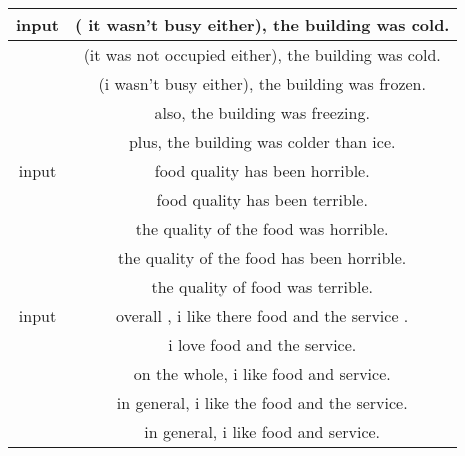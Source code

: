 \iffalse
  \begin{table}[ht]
\centering
\begin{tabular}[t]{c|c}
\hline

\hline
\small input	&\small ( it wasn't busy either), the building was cold.  	\\\hline
\small &	\small (it was not occupied either), the building was cold. 		\\
\small 	&\small (i wasn't busy either), the building was frozen. 	\\
\small 	&\small also, the building was freezing.  	\\
\small 	&\small plus, the building was colder than ice. \\\hline
\small input &\small food quality has been horrible.
\\\hline
\small &\small 		food quality has been terrible.  	\\
\small 	&\small the quality of the food was horrible.  	\\
\small & \small 	the quality of the food has been horrible. 	\\
\small 	& \small the quality of food was terrible.  \\
\hline
\small input	&\small  overall , i like there food and the service .	\\\hline
\small &	\small 	i love food and the service. 	\\
\small 	&\small on the whole, i like food and service. 	 	\\
\small &\small 	in general, i like the food and the service.  \\
\small &\small 	in general, i like food and service. 	 \\
\hline


\end{tabular}
\end{table}
